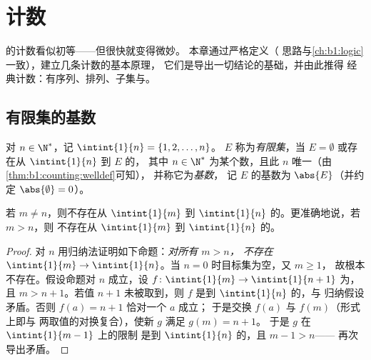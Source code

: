 \chapter{计数}\label{ch:b1:counting}

的计数看似初等——但很快就变得微妙。
本章通过严格定义（
思路与\cref{ch:b1:logic}一致），建立几条计数的基本原理，
它们是导出一切结论的基础，并由此推得
经典计数：有序列、排列、子集与。

\section{有限集的基数}

\begin{definition}[有限集，基数]\label{def:b1:counting:card}
对 $n \in \N^*$，记 $\intint{1}{n} = \{1, 2, \dots,
n\}$。 $E$ 称为\emph{有限集}，当 $E = \emptyset$
或存在从 $\intint{1}{n}$ 到 $E$ 的，
其中 $n \in \N^*$ 为某个数，且此 $n$ 唯一（由\cref{thm:b1:counting:welldef}可知），
并称它为\emph{基数}，
记 $E$ 的基数为 $\abs{E}$（并约定 $\abs{\emptyset} = 0$）。
\end{definition}

\begin{theorem}[基数是良定义的]\label{thm:b1:counting:welldef}
若 $m \neq n$，则不存在从 $\intint{1}{m}$
到 $\intint{1}{n}$ 的。更准确地说，若 $m > n$，则
不存在从 $\intint{1}{m}$ 到 $\intint{1}{n}$ 的。
\end{theorem}

\begin{proof}
对 $n$ 用归纳法证明如下命题：\emph{对所有 $m > n$，
不存在 $\intint{1}{m} \to \intint{1}{n}$}。当 $n = 0$ 时目标集为空，又 $m \geq 1$，
故根本不存在。假设命题对 $n$ 成立，设 $f \colon
\intint{1}{m} \to \intint{1}{n+1}$ 为，
且 $m > n + 1$。若值 $n + 1$ 未被取到，则 $f$
是到 $\intint{1}{n}$ 的，与
归纳假设矛盾。否则 $f(a) = n + 1$ 恰对一个 $a$ 成立；
于是交换 $f(a)$ 与 $f(m)$（形式上即与
两取值的对换复合），使新 $g$ 满足 $g(m) = n + 1$。
于是 $g$ 在 $\intint{1}{m-1}$ 上的限制
是到 $\intint{1}{n}$ 的，且 $m - 1 > n$——
再次导出矛盾。
\end{proof}


